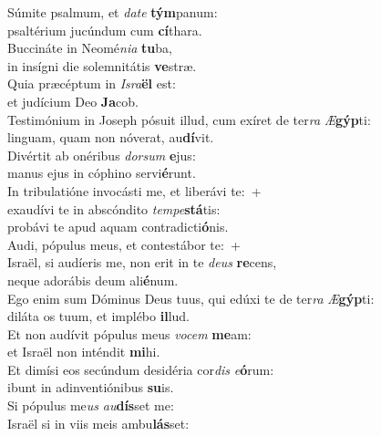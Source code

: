 \evenverse Súmite psalmum, et \textit{da}\textit{te} \textbf{tým}panum:~\*\\
\evenverse psaltérium jucúndum cum \textbf{cí}thara.\\
\oddverse Buccináte in Neomé\textit{ni}\textit{a} \textbf{tu}ba,~\*\\
\oddverse in insígni die solemnitátis \textbf{ve}stræ.\\
\evenverse Quia præcéptum in \textit{Is}\textit{ra}\textbf{ël} est:~\*\\
\evenverse et judícium Deo \textbf{Ja}cob.\\
\oddverse Testimónium in Joseph pósuit illud, cum exíret de ter\textit{ra} \textit{Æ}\textbf{gýp}ti:~\*\\
\oddverse linguam, quam non nóverat, au\textbf{dí}vit.\\
\evenverse Divértit ab onéribus \textit{dor}\textit{sum} \textbf{e}jus:~\*\\
\evenverse manus ejus in cóphino servi\textbf{é}runt.\\
\oddverse In tribulatióne invocásti me, et liberávi te:~+\\
\oddverse  exaudívi te in abscóndito \textit{tem}\textit{pe}\textbf{stá}tis:~\*\\
\oddverse probávi te apud aquam contradicti\textbf{ó}nis.\\
\evenverse Audi, pópulus meus, et contestábor te:~+\\
\evenverse  Israël, si audíeris me, non erit in te \textit{de}\textit{us} \textbf{re}cens,~\*\\
\evenverse neque adorábis deum ali\textbf{é}num.\\
\oddverse Ego enim sum Dóminus Deus tuus, qui edúxi te de ter\textit{ra} \textit{Æ}\textbf{gýp}ti:~\*\\
\oddverse diláta os tuum, et implébo \textbf{il}lud.\\
\evenverse Et non audívit pópulus meus \textit{vo}\textit{cem} \textbf{me}am:~\*\\
\evenverse et Israël non inténdit \textbf{mi}hi.\\
\oddverse Et dimísi eos secúndum desidéria cor\textit{dis} \textit{e}\textbf{ó}rum:~\*\\
\oddverse ibunt in adinventiónibus \textbf{su}is.\\
\evenverse Si pópulus me\textit{us} \textit{au}\textbf{dís}set me:~\*\\
\evenverse Israël si in viis meis ambu\textbf{lás}set:\\
